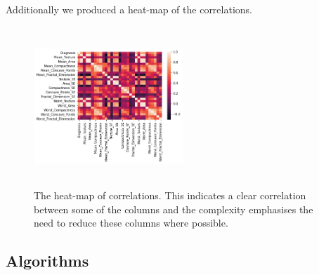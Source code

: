 \documentclass[conference]{IEEEtran}
\begin{document}
Additionally we produced a heat-map of the correlations.
\begin{figure}[H]
\caption{The heat-map of correlations. This indicates a clear correlation between some of the columns and the complexity emphasises the need to reduce these columns where possible.}
\centering
\includegraphics[height=60mm,width=0.5\textwidth]{correlation_heatmap.PNG}
\end{figure}
\subsection{Algorithms}
\end{document}
